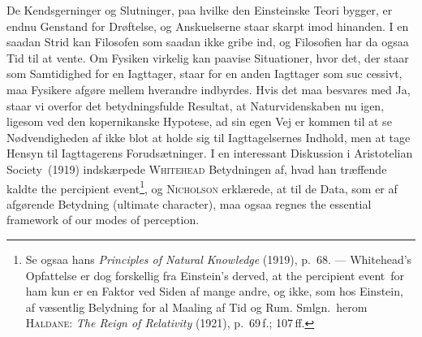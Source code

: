 \documentclass[12pt]{article}
\newcommand{\opage}[1]{\marginnote{\footnotesize\textit{[#1]}}}
\begin{document}
De Kendsgerninger og Slutninger, paa hvilke den Einsteinske Teori bygger,
er endnu Genstand for Drøftelse, og Anskuelserne staar skarpt imod
hinanden. I en saadan Strid kan Filosofen som saadan ikke gribe ind, og
Filosofien har da ogsaa Tid til at vente. Om Fysiken virkelig kan paavise
Situationer, hvor det, der staar som Samtidighed for en Iagttager, staar
for en anden Iagttager som suc%
\opage{75}\setcounter{footnote}{0}%
cessivt, maa Fysikere afgøre mellem
hverandre indbyrdes. Hvis det maa besvares med Ja, staar vi overfor det
betydningsfulde Resultat, at Naturvidenskaben nu igen, ligesom ved den
kopernikanske Hypotese, ad sin egen Vej er kommen til at se Nødvendigheden
af ikke blot at holde sig til Iagttagelsernes Indhold, men at tage Hensyn
til Iagttagerens Forudsætninger. I en interessant Diskussion i
\guillemotright Aristotelian Society\guillemotleft\ (1919) indskærpede
\textsc{Whitehead} Betydningen af, hvad han træffende kaldte
\guillemotright the percipient event\guillemotleft\footnote{Se ogsaa hans
  \textit{Principles of Natural Knowledge} (1919), p.~68. --- Whitehead's
  Opfattelse er dog forskellig fra Einstein's derved, at \guillemotright the
  percipient event\guillemotleft\ for ham kun er en Faktor ved Siden af mange
  andre, og ikke, som hos Einstein, af væsentlig Belydning for al Maaling af
  Tid og Rum. Smlgn.\ herom \textsc{Haldane}: \textit{The Reign of Relativity}
  (1921), p.~69\,f.; 107\,ff.},
og \textsc{Nicholson} erklærede, at til de Data, som er af
afgørende Betydning (ultimate character), maa ogsaa regnes
\guillemotright the essential framework of our modes of
perception.\guillemotleft
\end{document}
